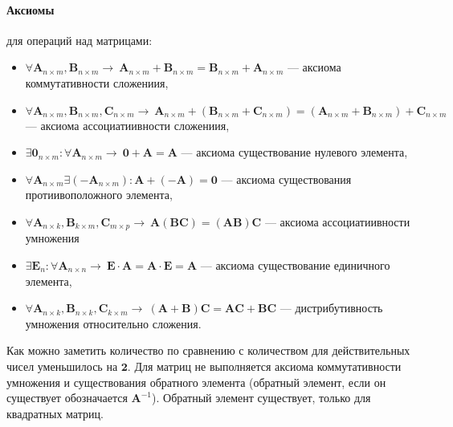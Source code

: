 \paragraph{Аксиомы} для операций над матрицами:
\begin{itemize}
	\item $\forall \textbf{A}_{n\times m}, \textbf{B}_{n\times m} \rightarrow~\textbf{A}_{n\times m}+\textbf{B}_{n\times m}=\textbf{B}_{n\times m}+\textbf{A}_{n\times m}$ --- аксиома коммутативности сложениия,
	
	\item $\forall \textbf{A}_{n\times m}, \textbf{B}_{n\times m}, \textbf{C}_{n\times m} \rightarrow~\textbf{A}_{n\times m}+(\textbf{B}_{n\times m}+\textbf{C}_{n\times m})=(\textbf{A}_{n\times m}+\textbf{B}_{n\times m})+\textbf{C}_{n\times m}$ --- аксиома ассоциатиивности сложениия,
	
	\item $\exists \textbf{0}_{n\times m}: \forall \textbf{A}_{n\times m} \rightarrow~\textbf{0}+\textbf{A} = \textbf{A}$ --- аксиома существование нулевого элемента,
	
	\item $\forall \textbf{A}_{n\times m} \exists (-\textbf{A}_{n\times m}): \textbf{A} + (-\textbf{A}) = \textbf{0}$ --- аксиома существования протиивоположного элемента,
	
	
	\item $\forall \textbf{A}_{n\times k}, \textbf{B}_{k\times m}, \textbf{C}_{m\times p} \rightarrow~\textbf{A}(\textbf{B}\textbf{C}) = (\textbf{A}\textbf{B})\textbf{C}$ --- аксиома ассоциатиивности умножения
	
	\item $\exists \textbf{E}_{n}: \forall \textbf{A}_{n\times n} \rightarrow~\textbf{E}\cdot\textbf{A} = \textbf{A}\cdot\textbf{E} = \textbf{A}$ --- аксиома существование единичного элемента,
	
	\item $\forall \textbf{A}_{n\times k}, \textbf{B}_{n\times k}, \textbf{C}_{k\times m} \rightarrow~ (\textbf{A} +\textbf{B})\textbf{C} = \textbf{A}\textbf{C} + \textbf{B}\textbf{C}$ --- дистрибутивность умножения относительно сложения.
\end{itemize}

Как можно заметить количество {} по сравнению с количеством {} для действительных чисел уменьшилось на $\textbf{2}$. Для матриц не выполняется аксиома коммутативности умножения и существования обратного элемента (обратный элемент, если он существует обозначается $\textbf{A}^{-1}$). Обратный элемент существует, только для квадратных матриц.



